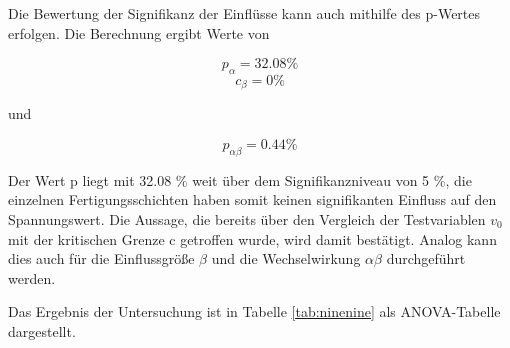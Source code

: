 \noindent Die Bewertung der Signifikanz der Einfl\"{u}sse kann auch mithilfe des p-Wertes erfolgen. Die Berechnung ergibt Werte von

\begin{equation}\label{eq:ninefiftyeight}
p_{\alpha} = 32.08\%
\end{equation}
\begin{equation}\label{eq:ninefiftynine}
c_{\beta } =0\%
\end{equation}

\noindent und

\begin{equation}\label{eq:ninesixty}
p_{\alpha \beta} = 0.44\%
\end{equation}

\noindent Der Wert p liegt mit 32.08 \% weit \"{u}ber dem Signifikanzniveau von 5 \%, die einzelnen Fertigungsschichten haben somit keinen signifikanten Einfluss auf den Spannungswert. Die Aussage, die bereits \"{u}ber den Vergleich der Testvariablen $v_{0}$ mit der kritischen Grenze c getroffen wurde, wird damit best\"{a}tigt. Analog kann dies auch f\"{u}r die Einflussgr\"{o}{\ss}e $\beta$ und die Wechselwirkung $\alpha\beta$ durchgef\"{u}hrt werden.\newline

\noindent Das Ergebnis der Untersuchung ist in Tabelle \ref{tab:ninenine} als ANOVA-Tabelle dargestellt.

\clearpage

